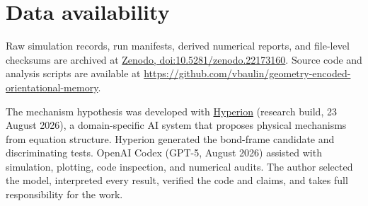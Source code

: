 \documentclass[aps,prl,reprint,superscriptaddress,nofootinbib,floatfix]{revtex4-2}
\begin{document}
\section*{Data availability}
Raw simulation records, run manifests, derived numerical reports, and
file-level checksums are archived at
\href{https://doi.org/10.5281/zenodo.22173160}{Zenodo,
doi:10.5281/zenodo.22173160}. Source code and analysis scripts are available
at \url{https://github.com/vbaulin/geometry-encoded-orientational-memory}.

\begin{acknowledgments}
The mechanism hypothesis was developed with
\href{https://synthetix.institute}{Hyperion} (research build, 23 August 2026),
a domain-specific AI system that proposes physical mechanisms from equation
structure. Hyperion generated the bond-frame candidate and discriminating
tests. OpenAI Codex (GPT-5, August 2026) assisted with simulation, plotting,
code inspection, and numerical audits. The author selected the model,
interpreted every result, verified the code and claims, and takes full
responsibility for the work.
\end{acknowledgments}
\end{document}
